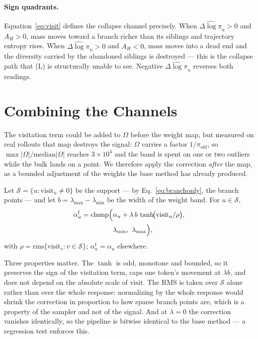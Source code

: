 \documentclass[11pt]{article}
\newcommand{\AH}{A_{H}}
\newcommand{\Om}{\Omega}
\begin{document}
\paragraph{Sign quadrants.}
Equation~\eqref{eq:visit} defines the collapse channel precisely.
When $\widehat{\Delta \log \pi}_u > 0$ and $\AH > 0$, mass moves toward a branch
richer than its siblings and trajectory entropy rises. When
$\widehat{\Delta \log \pi}_u > 0$ and $\AH < 0$, mass moves into a dead end and the
diversity carried by the abandoned siblings is destroyed --- this is the collapse
path that (L) is structurally unable to see. Negative
$\widehat{\Delta \log \pi}_u$ reverses both readings.

\section{Combining the Channels}
\label{sec:combine}

The visitation term could be added to $\Om$ before the weight map, but measured on
real rollouts that map destroys the signal: $\Om$ carries a factor
$1/\pi_{\mathrm{old}}$, so $\max|\Om| / \mathrm{median}|\Om|$ reaches $3\times10^{4}$
and the band is spent on one or two outliers while the bulk lands on a point. We
therefore apply the correction \emph{after} the map, as a bounded adjustment of the
weights the base method has already produced.

Let $\mathcal{S} = \{u : \mathrm{visit}_u \neq 0\}$ be the support --- by
Eq.~\eqref{eq:branchonly}, the branch points --- and let
$b = \lambda_{\max} - \lambda_{\min}$ be the width of the weight band. For
$u \in \mathcal{S}$,
%
\begin{equation}
\begin{split}
\alpha^{\mathrm{f}}_u = \mathrm{clamp}\Bigl(&\alpha_u
  + \lambda\, b\, \tanh\!\bigl(\mathrm{visit}_u / \rho\bigr),\\
  &\lambda_{\min},\ \lambda_{\max}\Bigr),
\end{split}
\label{eq:combine}
\end{equation}
%
with $\rho = \mathrm{rms}\{\mathrm{visit}_v : v \in \mathcal{S}\}$;
$\alpha^{\mathrm{f}}_u = \alpha_u$ elsewhere.

Three properties matter. The $\tanh$ is odd, monotone and bounded, so it preserves
the sign of the visitation term, caps one token's movement at $\lambda b$, and does
not depend on the absolute scale of $\mathrm{visit}$. The RMS is taken over
$\mathcal{S}$ alone rather than over the whole response: normalizing by the whole
response would shrink the correction in proportion to how sparse branch points are,
which is a property of the sampler and not of the signal. And at $\lambda = 0$ the
correction vanishes identically, so the pipeline is bitwise identical to the base
method --- a regression test enforces this.
\end{document}
